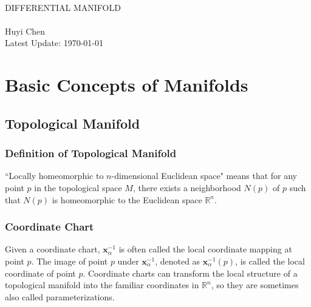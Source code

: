 \documentclass{report}
\begin{document}
\begin{center}
	~\\
	\vspace{6em}
	\textsc{\Huge DIFFERENTIAL MANIFOLD}
	~\\
	\vspace{2.5em}
	{\Large }
	~\\
	\vspace{6em}
	\textsf{Huyi Chen}
	~\\
	\vspace{5in}
	{\large Latest Update: \today}
\end{center}
\newpage
\tableofcontents

\chapter{Basic Concepts of Manifolds}
\section{Topological Manifold}
\subsection{Definition of Topological Manifold}
``Locally homeomorphic to $n$-dimensional Euclidean space" means that for any point $p$ in the topological space $M$, there exists a neighborhood $N(p)$ of $p$ such that $N(p)$ is homeomorphic to the Euclidean space $\mathbb{R}^n$.

\subsection{Coordinate Chart}


Given a coordinate chart, $\mathbf{x}^{-1}_{\alpha}$ is often called the local coordinate mapping at point $p$. The image of point $p$ under $\mathbf{x}^{-1}_{\alpha}$, denoted as $\mathbf{x}^{-1}_\alpha(p)$, is called the local coordinate of point $p$. Coordinate charts can transform the local structure of a topological manifold into the familiar coordinates in $\mathbb{R}^n$, so they are sometimes also called parameterizations.
\end{document}

